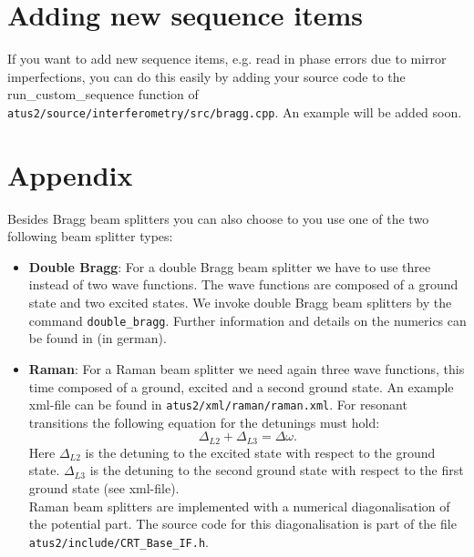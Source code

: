 \documentclass[12pt]{article}
\begin{document}
\section{Adding new sequence items}
\label{sec:adding_new_sequences}
If you want to add new sequence items, e.g. read in phase errors due to mirror
imperfections, you can do this easily by adding your source code 
to the run\_custom\_sequence function of
\texttt{atus2/source/interferometry/src/bragg.cpp}.
An example will be added soon.


\section{Appendix}
Besides Bragg beam splitters you can also choose to you use one of the
two following beam splitter types:
\begin{itemize}
  \item \textbf{Double Bragg}:
        For a double Bragg beam splitter we have to use three instead of two
        wave functions. The wave functions are composed of a ground state and two
        excited states. We invoke double Bragg beam splitters by the command
        \texttt{double_bragg}. Further information and details on the
        numerics can be found in \cite{rosskamp_modellierung_2014} (in german).
      \item \textbf{Raman}: 
        For a Raman beam splitter we need again three wave functions, this time composed
        of a ground, excited and a second ground state. An example xml-file can be
        found in \texttt{atus2/xml/raman/raman.xml}. 
        For resonant transitions the following
        equation for the detunings must hold:
        \begin{equation}
          \Delta_{L2}+\Delta_{L3}=\Delta \omega.
        \end{equation}
        Here $\Delta_{L2}$ is the detuning to the excited state with respect to the
        ground state. $\Delta_{L3}$ is the detuning to the second ground state with
        respect to the first ground state (see xml-file). \\
        Raman beam splitters are implemented with a numerical diagonalisation of the 
        potential part. The source code for this diagonalisation is part of the file 
        \texttt{atus2/include/CRT_Base_IF.h}. 

\end{itemize}



\end{document}
